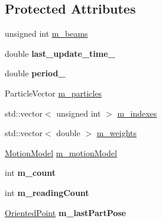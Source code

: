 \subsection*{Protected Attributes}
\begin{DoxyCompactItemize}
\item 
unsigned int \hyperlink{classGMapping_1_1GridSlamProcessor_aec30b4ee3a767c9f50bb95236851a1be}{m\+\_\+beams}
\item 
\mbox{\label{classGMapping_1_1GridSlamProcessor_a3f40a117057427e725aa92739dbe2480}} 
double {\bfseries last\+\_\+update\+\_\+time\+\_\+}
\item 
\mbox{\label{classGMapping_1_1GridSlamProcessor_a83d163ab15cf15856ea69507ec87904a}} 
double {\bfseries period\+\_\+}
\item 
Particle\+Vector \hyperlink{classGMapping_1_1GridSlamProcessor_a67c2ade1a066269de12fe382999f2905}{m\+\_\+particles}
\item 
std\+::vector$<$ unsigned int $>$ \hyperlink{classGMapping_1_1GridSlamProcessor_a79cee7069bb938f3b9d6d35b42b48ec6}{m\+\_\+indexes}
\item 
std\+::vector$<$ double $>$ \hyperlink{classGMapping_1_1GridSlamProcessor_a39e71ee439dde6ca9ccd2929cf12551f}{m\+\_\+weights}
\item 
\hyperlink{structGMapping_1_1MotionModel}{Motion\+Model} \hyperlink{classGMapping_1_1GridSlamProcessor_ae1fa20e9679abdbc23784e2dc17194b5}{m\+\_\+motion\+Model}
\item 
\mbox{\label{classGMapping_1_1GridSlamProcessor_a1c7e0a4fec2a31769f27fd17a9cfac3d}} 
int {\bfseries m\+\_\+count}
\item 
\mbox{\label{classGMapping_1_1GridSlamProcessor_a50a21e3936bb5c122a9e4b8039be9bc9}} 
int {\bfseries m\+\_\+reading\+Count}
\item 
\mbox{\label{classGMapping_1_1GridSlamProcessor_aeddf8ebf9784e818d93a4c5bb94e3c0d}} 
\hyperlink{structGMapping_1_1orientedpoint}{Oriented\+Point} {\bfseries m\+\_\+last\+Part\+Pose}
\item 
\mbox{\label{classGMapping_1_1GridSlamProcessor_a242df41618ccce684a01229c3c752dc9}} 

\end{DoxyCompactItemize}
